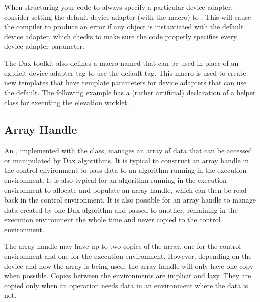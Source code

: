 When structuring your code to always specify a particular device adapter,
consider setting the default device adapter (with the
 macro) to
. This will cause the compiler to
produce an error if any object is instantiated with the default device
adapter, which checks to make sure the code properly specifies every device
adapter parameter.

The Dax toolkit also defines a macro named
 that can be used in place of
an explicit device adapter tag to use the default tag. This macro is used
to create new templates that have template parameters for device adapters
that can use the default. The following example has a (rather artificial)
declaration of a helper class for executing the elevation worklet.
\begin{daxexample}{Declaring a template with a default device adapter.}
template<typename DeviceAdapter = DAX_DEFAULT_DEVICE_ADAPTER_TAG>
class MyElevationDispatcher
{
public:
  void DoInvoke()
  {
    dax::cont::DispatcherMapField<dax::Worklet::Elevation,DeviceAdapter> dispatcher;
    dispatcher.Invoke(this->Grid.GetPointCoordinates(), this->OutPointElevation);
\end{daxexample}


\subsection{Array Handle}
\label{sec:ArrayHandle}


An , implemented with the 
class, manages an array of data that can be accessed or manipulated by Dax
algorithms. It is typical to construct an array handle in the control
environment to pass data to an algorithm running in the execution
environment. It is also typical for an algorithm running in the execution
environment to allocate and populate an array handle, which can then be
read back in the control environment. It is also possible for an array
handle to manage data created by one Dax algorithm and passed to another,
remaining in the execution environment the whole time and never copied to
the control environment.

The array handle may have up to two copies of the array, one for the
control environment and one for the execution environment. However,
depending on the device and how the array is being used, the array handle
will only have one copy when possible. Copies between the environments are
implicit and lazy. They are copied only when an operation needs data in an
environment where the data is not.

